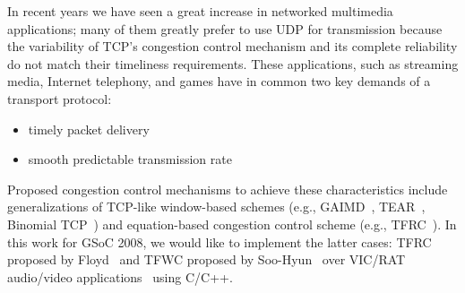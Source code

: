 
In recent years we have seen a great increase in networked multimedia
applications; many of them greatly prefer to use UDP for transmission because
the variability of TCP's congestion control mechanism and its complete
reliability do not match their timeliness requirements. These applications, such
as streaming media, Internet telephony, and games have in common two key demands
of a transport protocol:

\vspace{-0.2in}
\begin{itemize}

\item timely packet delivery
\item smooth predictable transmission rate

\end{itemize}

\vspace{-0.2in}
Proposed congestion control mechanisms to achieve these characteristics include
generalizations of TCP-like window-based schemes (e.g., GAIMD~\cite{YL00},
TEAR~\cite{ROY00}, Binomial TCP~\cite{BB01}) and equation-based congestion
control scheme (e.g., TFRC~\cite{FHPW00}).  In this work for GSoC 2008, we would
like to implement the latter cases: TFRC proposed by Floyd~\cite{FHPW00} and
TFWC proposed by Soo-Hyun~\cite{SH06} over VIC/RAT audio/video
applications~\cite{AVATS} using \textsf{C/C++}.

